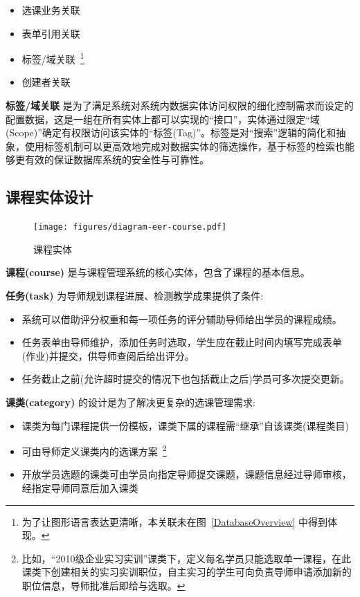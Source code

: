 \begin{itemize}
  \item 选课业务关联
  \item 表单引用关联
  \item 标签/域关联~\footnote{为了让图形语言表达更清晰，本关联未在图~\ref{DatabaseOverview} 中得到体现。}
  \item 创建者关联
\end{itemize}

\textbf{标签/域关联} 是为了满足系统对系统内数据实体访问权限的细化控制需求而设定的配置数据，这是一组在所有实体上都可以实现的“接口”，实体通过限定“域(Scope)”确定有权限访问该实体的“标签(Tag)”。标签是对“搜索”逻辑的简化和抽象，使用标签机制可以更高效地完成对数据实体的筛选操作，基于标签的检索也能够更有效的保证数据库系统的安全性与可靠性。

\newpage

\subsection{课程实体设计}

\begin{figure}[!h]
  \begin{center}
    \texttt{[image: figures/diagram-eer-course.pdf]}
    \caption{课程实体\label{DatabaseEntityCourse}}
  \end{center}
\end{figure}

\textbf{课程(course)} 是与课程管理系统的核心实体，包含了课程的基本信息。

\textbf{任务(task)} 为导师规划课程进展、检测教学成果提供了条件:

\begin{itemize}
  \item 系统可以借助评分权重和每一项任务的评分辅助导师给出学员的课程成绩。

  \item 任务表单由导师维护，添加任务时选取，学生应在截止时间内填写完成表单(作业)并提交，供导师查阅后给出评分。

  \item 任务截止之前(允许超时提交的情况下也包括截止之后)学员可多次提交更新。
\end{itemize}

\textbf{课类(category)} 的设计是为了解决更复杂的选课管理需求:

\begin{itemize}
  \item 课类为每门课程提供一份模板，课类下属的课程需“继承”自该课类(课程类目)
  \item 可由导师定义课类内的选课方案~\footnote{比如，“2010级企业实习实训”课类下，定义每名学员只能选取单一课程，在此课类下创建相关的实习实训职位，自主实习的学生可向负责导师申请添加新的职位信息，导师批准后即给与选取。}
  \item 开放学员选题的课类可由学员向指定导师提交课题，课题信息经过导师审核，经指定导师同意后加入课类
\end{itemize}

